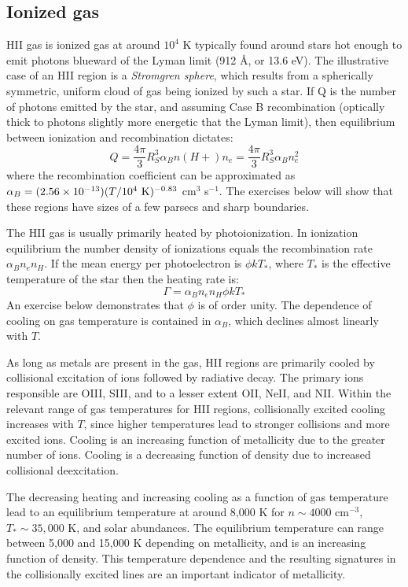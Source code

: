 \subsection{Ionized gas}

HII gas is ionized gas at around $10^4$ K typically found around stars
hot enough to emit photons blueward of the Lyman limit (912 \AA, or
13.6 eV). The illustrative case of an HII region is a {\it Stromgren
sphere}, which results from a spherically symmetric, uniform cloud of
gas being ionized by such a star. If Q is the number of photons
emitted by the star, and assuming Case B recombination (optically
thick to photons slightly more energetic that the Lyman limit), then
equilibrium between ionization and recombination dictates:
\begin{equation}
Q = \frac{4\pi}{3} R_{S}^3 \alpha_B n(H+) n_e = 
\frac{4\pi}{3} R_{S}^3 \alpha_B n_e^2 
\end{equation}
where the recombination coefficient can be approximated as $\alpha_B =
(2.56 \times 10^{-13}) (T/10^4 {\rm ~K})^{-0.83}$ cm$^3$ s$^{-1}$. The
exercises below will show that these regions have sizes of a few
parsecs and sharp boundaries. 

The HII gas is usually primarily heated by photoionization. In
ionization equilibrium the number density of ionizations equals the
recombination rate $\alpha_B n_e n_H$. If the mean energy per
photoelectron is $\phi kT_\ast$, where $T_\ast$ is the effective
temperature of the star then the heating rate is:
\begin{equation}
\Gamma = \alpha_B n_e n_H \phi k T_\ast
\end{equation}
An exercise below demonstrates that $\phi$ is of order unity. The
dependence of cooling on gas temperature is contained in $\alpha_B$,
which declines almost linearly with $T$. 

As long as metals are present in the gas, HII regions are primarily
cooled by collisional excitation of ions followed by radiative
decay. The primary ions responsible are OIII, SIII, and to a lesser
extent OII, NeII, and NII. Within the relevant range of gas
temperatures for HII regions, collisionally excited cooling increases
with $T$, since higher temperatures lead to stronger collisions and
more excited ions. Cooling is an increasing function of metallicity
due to the greater number of ions. Cooling is a decreasing function of
density due to increased collisional deexcitation.

The decreasing heating and increasing cooling as a function of gas
temperature lead to an equilibrium temperature at around 8,000 K for
$n \sim 4000$ cm$^{-3}$, $T_\ast \sim 35,000$ K, and solar
abundances. The equilibrium temperature can range between 5,000 and
15,000 K depending on metallicity, and is an increasing function of
density. This temperature dependence and the resulting signatures in
the collisionally excited lines are an important indicator of
metallicity.

